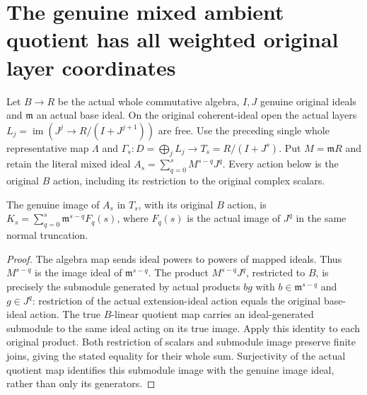 \section{The genuine mixed ambient quotient has all weighted original layer coordinates}

Let $B\to R$ be the actual whole commutative algebra, $I,J$ genuine
original ideals and $\mathfrak m$ an actual base ideal. On the original
coherent-ideal open the actual layers $L_j=\operatorname{im}(J^j\to
R/(I+J^{j+1}))$ are free. Use the preceding single whole representative
map $\Lambda$ and $\Gamma_s:D=\bigoplus_jL_j\to T_s=R/(I+J^s)$.
Put $M=\mathfrak m R$ and retain the literal mixed ideal
$A_s=\sum_{q=0}^s M^{s-q}J^q$. Every action below is the original
$B$ action, including its restriction to the original complex scalars.

\begin{lemma}
\label{hir:relative-normal-actual-mixed-image-weighted-power-filtration}
\leanok
The genuine image of $A_s$ in $T_s$, with its original $B$ action, is
$K_s=\sum_{q=0}^s\mathfrak m^{s-q}F_q(s)$, where $F_q(s)$ is the
actual image of $J^q$ in the same normal truncation.
\end{lemma}
\begin{proof}
The algebra map sends ideal powers to powers of mapped ideals.
Thus $M^{s-q}$ is the image ideal of $\mathfrak m^{s-q}$.
The product $M^{s-q}J^q$, restricted to $B$, is precisely the
submodule generated by actual products $b g$ with
$b\in\mathfrak m^{s-q}$ and $g\in J^q$: restriction of the
actual extension-ideal action equals the original base-ideal action.
The true $B$-linear quotient map carries an ideal-generated submodule
to the same ideal acting on its true image. Apply this identity to
each original product. Both restriction of scalars and submodule image
preserve finite joins, giving the stated equality for their whole sum.
Surjectivity of the actual quotient map identifies this submodule
image with the genuine image ideal, rather than only its generators.
\end{proof}


